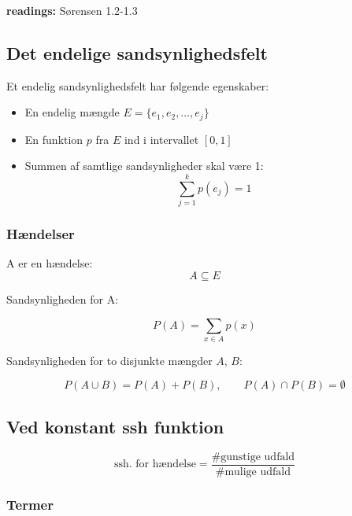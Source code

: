 
\textbf{readings:} Sørensen 1.2-1.3

\subsection{Det endelige sandsynlighedsfelt}

Et endelig sandsynlighedsfelt har følgende egenskaber:

\begin{itemize}
    \item En endelig mængde $E = \{e_1, e_2, \ldots, e_j\}$
    \item En funktion $p$ fra $E$ ind i intervallet $[0,1]$
    \item Summen af samtlige sandsynligheder skal være 1:
    \begin{equation}
    \sum_{j=1}^{k}p(e_j) = 1
    \end{equation}
\end{itemize}  

\subsubsection{Hændelser}

A  er en hændelse:
\begin{equation}
	A \subseteq E
\end{equation}

Sandsynligheden for A:

\begin{equation}
    P(A) = \sum_{x\in A} p(x)
\end{equation}

Sandsynligheden for to disjunkte mængder $A$, $B$:

\begin{equation}
    P(A \cup B) = P(A) + P(B), \qquad P(A) \cap P(B) = \emptyset
\end{equation}

\subsection{Ved konstant ssh funktion}

\begin{equation}
    \text{ssh. for hændelse} = \frac{\text{\# gunstige udfald}}{\text{\#  mulige udfald}}
\end{equation}


\subsubsection{Termer}

